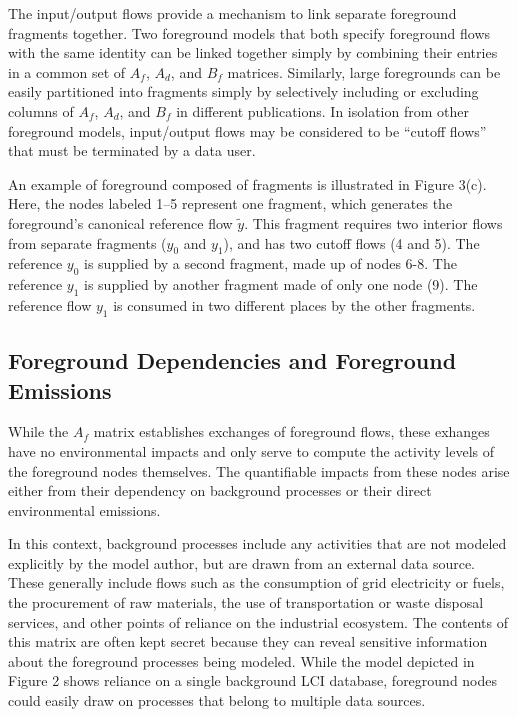 The input/output flows provide a mechanism to link separate foreground fragments together.  Two foreground models that both specify foreground flows with the same identity can be linked together simply by combining their entries in a common set of $A_f$, $A_d$, and $B_f$ matrices.  Similarly, large foregrounds can be easily partitioned into fragments simply by selectively including or excluding columns of $A_f$, $A_d$, and $B_f$ in different publications.
In isolation from other foreground models, input/output flows may be considered to be ``cutoff flows'' that must be terminated by a data user.

An example of foreground composed of fragments is illustrated in Figure 3(c).  Here, the nodes labeled 1--5 represent one fragment, which generates the foreground's canonical reference flow $\tilde{y}$. This fragment requires two interior flows from separate fragments ($y_0$ and $y_1$), and has two cutoff flows (4 and 5).  The reference $y_0$ is supplied by a second fragment, made up of nodes 6-8.  The reference $y_1$ is supplied by another fragment made of only one node (9). The reference flow $y_1$ is consumed in two different places by the other fragments.


\subsection{Foreground Dependencies and Foreground Emissions}

While the $A_f$ matrix establishes exchanges of foreground flows, these exhanges have no environmental impacts and only serve to compute the activity levels of the foreground nodes themselves.  The quantifiable impacts from these nodes arise either from their dependency on background processes or their direct environmental emissions.  

In this context, background processes include any activities that are not modeled explicitly by the model author, but are drawn from an external data source.  These generally include flows such as the consumption of grid electricity or fuels, the procurement of raw materials, the use of transportation or waste disposal services, and other points of reliance on the industrial ecosystem.  The contents of this matrix are often kept secret because they can reveal sensitive information about the foreground processes being modeled.  While the model depicted in Figure 2 shows reliance on a single background LCI database, foreground nodes could easily draw on processes that belong to multiple data sources.

